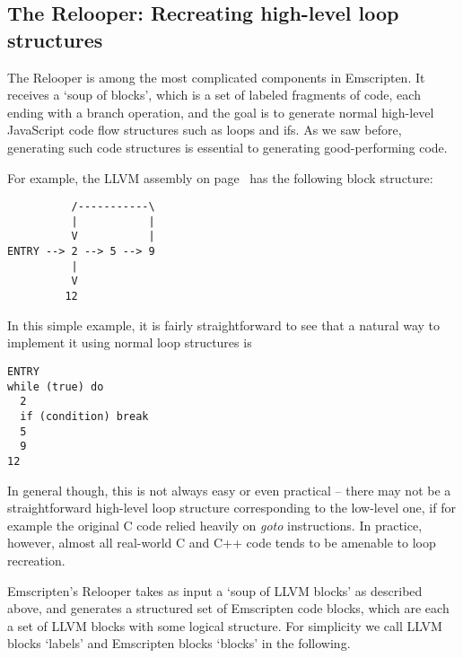 \documentclass[11pt]{proc}
\begin{document}
\subsection{The Relooper: Recreating high-level loop structures}
\label{sec:relooper}

The Relooper is among the most complicated components in Emscripten. It receives
a `soup of blocks', which is a set of labeled fragments of code, each
ending with a branch operation, and the goal is to generate normal
high-level JavaScript code flow structures such as loops and ifs. As
we saw before, generating such code structures is essential to generating good-performing code.

For example, the LLVM assembly on page~\pageref{code:examplellvm} has the following block
structure:
\begin{verbatim}
          /-----------\
          |           |
          V           |
ENTRY --> 2 --> 5 --> 9
          |
          V
         12
\end{verbatim}
In this simple example, it is fairly straightforward to see that a natural way to implement it
using normal loop structures is
\begin{verbatim}
ENTRY
while (true) do
  2
  if (condition) break
  5
  9
12
\end{verbatim}
In general though, this is not always easy or even practical -- there may
not be a straightforward high-level loop structure corresponding to the low-level one, if
for example the original C code relied heavily on \emph{goto} instructions.
In practice, however, almost all real-world C and C++ code tends to
be amenable to loop recreation.

Emscripten's Relooper takes as input a `soup of LLVM blocks' as described above,
and generates a structured set of Emscripten code blocks, which are each a set of LLVM blocks
with some logical structure. For simplicity we call LLVM blocks `labels' and Emscripten
blocks `blocks' in the following.
\end{document}
